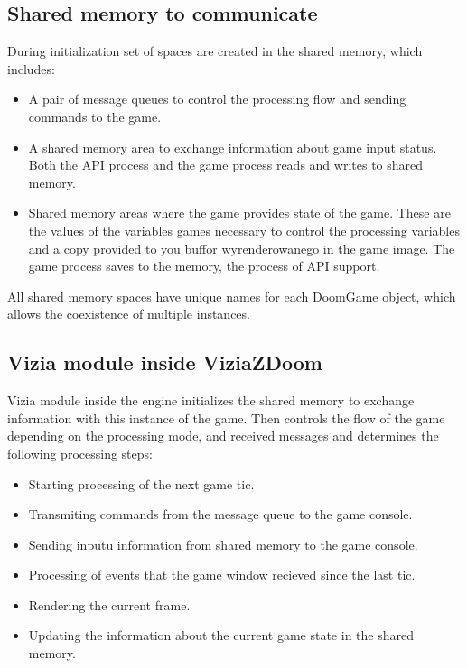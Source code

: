 \subsection{Shared memory to communicate}\label{sec:architecture_shared_memory}

During initialization set of spaces are created in the shared memory, which includes:
    \begin{itemize}
    \item A pair of message queues to control the processing flow and sending commands to the game.
    \item A shared memory area to exchange information about game input status. Both the API process and the game process reads and writes to shared memory.
    \item Shared memory areas where the game provides state of the game. These are the values of the variables games necessary to control the processing variables and a copy provided to you buffor wyrenderowanego in the game image. The game process saves to the memory, the process of API support.
    \end{itemize}
All shared memory spaces have unique names for each DoomGame object, which allows the coexistence of multiple instances.


\subsection{Vizia module inside ViziaZDoom}\label{sec:architecture_inside_viziazdoom}

Vizia module inside the engine initializes the shared memory to exchange information with this instance of the game. Then controls the flow of the game depending on the processing mode, and received messages and determines the following processing steps:

    \begin{itemize}
    \item Starting processing of the next game tic.
    \item Transmiting commands from the message queue to the game console.
    \item Sending inputu information from shared memory to the game console.
    \item Processing of events that the game window recieved since the last tic.
    \item Rendering the current frame.
    \item Updating the information about the current game state in the shared memory.
    \end{itemize}

